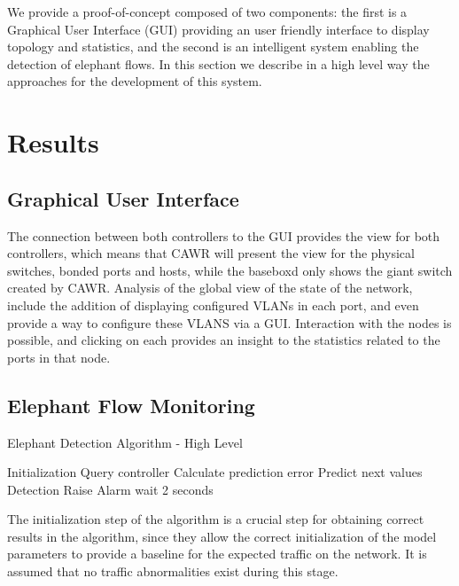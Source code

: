 \documentclass[a4paper]{IEEEtran}
\begin{document}
\par We provide a proof-of-concept composed of two components: the first is a Graphical User Interface (GUI) providing an user friendly interface to display 
topology and statistics, and the second is an intelligent system enabling the detection of elephant flows. In this section we describe in a high level way the 
approaches for the development of this system.

\section{Results}

\subsection{Graphical User Interface}

The connection between both controllers to the GUI provides the view for both controllers, which means that CAWR will present the view for the physical switches, 
bonded ports and hosts, while the baseboxd only shows the giant switch created by CAWR. Analysis of the global view of the state of the
network, include the addition of displaying configured VLANs in each port, and even provide a way to configure these VLANS via a GUI. Interaction with the nodes is 
possible, and clicking on each provides an insight to the statistics related to the ports in that node.

\subsection{Elephant Flow Monitoring}

\begin{algorithm}[H]
    \caption{Elephant Detection Algorithm - High Level} \label{alg:high_level}
    \begin{algorithmic}[1]
            \State Initialization
            \State Query controller
            \Loop
                \State Calculate prediction error
                \State Predict next values
                \State Detection
                    \State Raise Alarm
                \EndIf
                \State wait 2 seconds
            \EndLoop
        \EndProcedure
       \end{algorithmic}
\end{algorithm}

\par The initialization step of the algorithm is a crucial step for obtaining correct results in the algorithm, since they allow the correct initialization of
the model parameters to provide a baseline for the expected traffic on the network. It is assumed that no traffic abnormalities exist during this stage.
\end{document}
